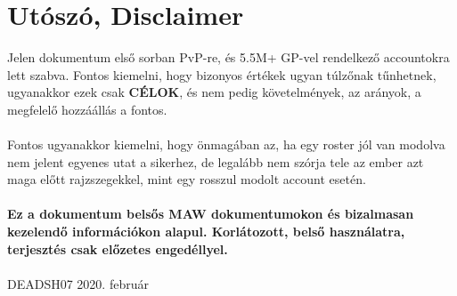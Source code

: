 \documentclass[11pt]{report}
\begin{document}

\chapter{Utószó, Disclaimer}
Jelen dokumentum első sorban PvP-re, és 5.5M+ GP-vel rendelkező accountokra lett szabva. Fontos kiemelni, hogy bizonyos értékek ugyan túlzőnak tűnhetnek, ugyanakkor ezek csak \textbf{CÉLOK}, és nem pedig követelmények, az arányok, a megfelelő hozzáállás a fontos.
\\
\\
Fontos ugyanakkor kiemelni, hogy önmagában az, ha egy roster jól van modolva nem jelent egyenes utat a sikerhez, de legalább nem szórja tele az ember azt maga előtt rajzszegekkel, mint egy rosszul modolt account esetén.
\\
\\
\textbf{Ez a dokumentum belsős MAW dokumentumokon és bizalmasan kezelendő információkon alapul. Korlátozott, belső használatra, terjesztés csak előzetes engedéllyel.}
\\
\\
\LARGE\textcopyright DEADSH07 2020. február
\end{document}
